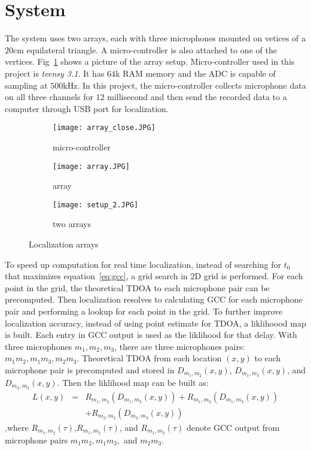 \section{System}
The system uses two arrays, each with three microphones mounted on vetices of a $20$cm equilateral triangle. A micro-controller is also attached to one of the vertices. Fig~\ref{fig:setup_array} shows a picture of the array setup. Micro-controller used in this project is \emph{teensy 3.1}. It has $64$k RAM memory and the ADC is capable of sampling at $500$kHz. In this project, the micro-controller collects microphone data on all three channels for $12$ millisecond and then send the recorded data to a computer through USB port for localization. 

\begin{figure}[]
  \centering
  \begin{subfigure}[]{.15\textwidth}
    \texttt{[image: array\_close.JPG]}
    \caption{micro-controller}
  \end{subfigure}
  \begin{subfigure}[]{.15\textwidth}
    \texttt{[image: array.JPG]}
    \caption{array}
  \end{subfigure}
  \begin{subfigure}[]{.15\textwidth}
    \texttt{[image: setup\_2.JPG]}
    \caption{two arrays}
  \end{subfigure}
  \caption{Localization arrays}
  \label{fig:setup_array}
\end{figure}

To speed up computation for real time localization, instead of searching for $t_0$ that maximizes equation~\ref{eq:gcc}, a grid search in 2D grid is performed. For each point in the grid, the theoretical TDOA to each microphone pair can be precomputed. Then localization resolves to calculating GCC for each microphone pair and performing a lookup for each point in the grid. To further improve localization accuracy, instead of using point estimate for TDOA, a liklihoood map is built. Each entry in GCC output is used as the liklihood for that delay. With three microphones $m_1,m_2,m_3$, there are three microphones pairs: $m_1m_2,m_1m_3,m_2m_3$. Theoretical TDOA from each location $(x,y)$ to each microphone pair is precomputed and stored in $D_{m_1,m_2}(x,y)$, $D_{m_1,m_3}(x,y)$, and $D_{m_2,m_3}(x,y)$. Then the liklihood map can be built as:
\begin{eqnarray*}
  L(x,y) &=& R_{m_1,m_2}(D_{m_1,m_2}(x,y)) + R_{m_1,m_3}(D_{m_1,m_3}(x,y)) \\
 & & +R_{m_2,m_3}(D_{m_2,m_3}(x,y)) 
\end{eqnarray*}
,where $R_{m_1,m_2}(\tau)$,$R_{m_1,m_2}(\tau)$, and $R_{m_1,m_2}(\tau)$ denote GCC output from microphone pairs $m_1m_2,m_1m_3,$ and $m_2m_3$.

